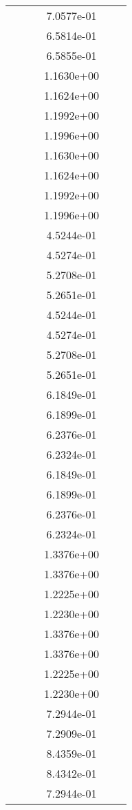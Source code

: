 \begin{xltabular}{\textwidth}{r|rS[table-format=1.3e+2]S[table-format=1.4e+2]S[table-format=1.4e+2]S[table-format=-1.5]}
&  &  & 7.0577e-01 & & \\
&  &  & 6.5814e-01 & & \\
&  &  & 6.5855e-01 & & \\
&  &  & 1.1630e+00 & & \\
&  &  & 1.1624e+00 & & \\
&  &  & 1.1992e+00 & & \\
&  &  & 1.1996e+00 & & \\
&  &  & 1.1630e+00 & & \\
&  &  & 1.1624e+00 & & \\
&  &  & 1.1992e+00 & & \\
&  &  & 1.1996e+00 & & \\
&  &  & 4.5244e-01 & & \\
&  &  & 4.5274e-01 & & \\
&  &  & 5.2708e-01 & & \\
&  &  & 5.2651e-01 & & \\
&  &  & 4.5244e-01 & & \\
&  &  & 4.5274e-01 & & \\
&  &  & 5.2708e-01 & & \\
&  &  & 5.2651e-01 & & \\
&  &  & 6.1849e-01 & & \\
&  &  & 6.1899e-01 & & \\
&  &  & 6.2376e-01 & & \\
&  &  & 6.2324e-01 & & \\
&  &  & 6.1849e-01 & & \\
&  &  & 6.1899e-01 & & \\
&  &  & 6.2376e-01 & & \\
&  &  & 6.2324e-01 & & \\
&  &  & 1.3376e+00 & & \\
&  &  & 1.3376e+00 & & \\
&  &  & 1.2225e+00 & & \\
&  &  & 1.2230e+00 & & \\
&  &  & 1.3376e+00 & & \\
&  &  & 1.3376e+00 & & \\
&  &  & 1.2225e+00 & & \\
&  &  & 1.2230e+00 & & \\
&  &  & 7.2944e-01 & & \\
&  &  & 7.2909e-01 & & \\
&  &  & 8.4359e-01 & & \\
&  &  & 8.4342e-01 & & \\
&  &  & 7.2944e-01 & & \\

\end{xltabular}
